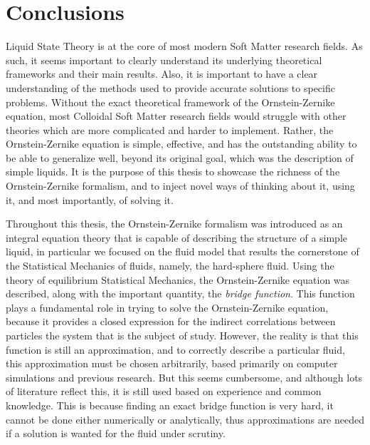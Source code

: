 \chapter{Conclusions}
\label{Cap6}

Liquid State Theory is at the core of most modern Soft Matter research fields. As such, it 
seems important to clearly understand its underlying theoretical frameworks and their main 
results. Also, it is important to have a clear understanding of the methods used to provide 
accurate solutions to specific problems. Without the exact theoretical framework of the 
Ornstein-Zernike equation, most Colloidal Soft Matter research fields would struggle with 
other theories which are more complicated and harder to implement. Rather, the 
Ornstein-Zernike equation is simple, effective, and has the outstanding ability to be able 
to generalize well, beyond its original goal, which was the description of simple liquids. 
It is the purpose of this thesis to showcase the richness of the Ornstein-Zernike 
formalism, and to inject novel ways of thinking about it, using it, and most importantly, 
of solving it.

Throughout this thesis, the Ornstein-Zernike formalism was introduced as an integral 
equation theory that is capable of describing the structure of a simple liquid, in 
particular we focused on the fluid model that results the cornerstone of the Statistical 
Mechanics of fluids,  namely,  the hard-sphere fluid. Using the theory of equilibrium 
Statistical Mechanics, the Ornstein-Zernike equation was described, along with the 
important quantity, the \emph{bridge function}. This function plays a fundamental role in 
trying to solve the Ornstein-Zernike equation, because it provides a closed expression  for 
the indirect correlations between particles the system that is the subject of study. 
However, the reality is that this function is still an approximation, and to correctly 
describe a particular fluid, this approximation must be chosen arbitrarily, based primarily 
on computer simulations and previous research. But this seems cumbersome, 
and although lots of literature reflect this, it is still used based on experience and 
common knowledge. This is because finding an exact bridge function is very hard, it cannot 
be done either numerically or analytically, thus approximations are needed if a solution is 
wanted for the fluid under scrutiny.

